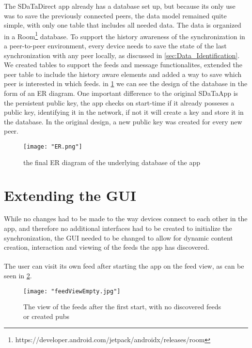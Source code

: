 The SDaTaDirect app already has a database set up, but because its only use was to save the previously connected peers, the data model remained quite simple, with only one table that includes all needed data. The data is organized in a Room\footnote{https://developer.android.com/jetpack/androidx/releases/room} database. To support the history awareness of the synchronization in a peer-to-peer environment, every device needs to save the state of the last synchronization with any peer locally, as discussed in \ref{sec:Data_Identification}. We created tables to support the feeds and message functionalites, extended the peer table to include the history aware elements and added a way to save which peer is interested in which feeds. in \ref{fig:ER} we can see the design of the database in the form of an ER diagram. One important difference to the original SDaTaApp is the persistent public key, the app checks on start-time if it already posseses a public key, identifying it in the network, if not it will create a key and store it in the database. In the original design, a new public key was created for every new peer. 

\begin{figure}[!h]
	\centering
	\texttt{[image: "ER.png"]}
	\caption{the final ER diagram of the underlying database of the app}
	\label{fig:ER}
\end{figure}

\section{Extending the GUI}

While no changes had to be made to the way devices connect to each other in the app, and therefore no additional interfaces had to be created to initialize the synchronization, the GUI needed to be changed to allow for dynamic content creation, interaction and viewing of the feeds the app has discovered. 
\\
\\
The user can visit its own feed after starting the app on the feed view, as can be seen in \ref{fig:emptyFeed}.
\clearpage
\begin{figure}[!h]
	\centering
	\texttt{[image: "feedViewEmpty.jpg"]}
	\caption{The view of the feeds after the first start, with no discovered feeds or created pubs}
	\label{fig:emptyFeed}
\end{figure}
 
